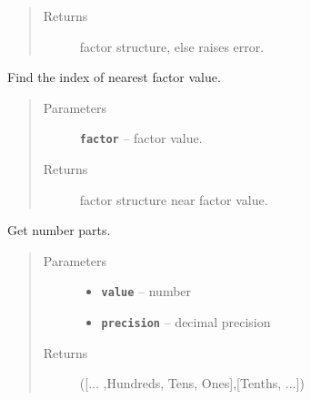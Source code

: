 \documentclass[letterpaper,10pt,english]{sphinxmanual}
\begin{document}
\begin{fulllineitems}
\begin{fulllineitems}
\begin{quote}
\begin{description}
\item[{Returns}] \leavevmode
factor structure, else raises error.

\end{description}\end{quote}

\end{fulllineitems}


\begin{fulllineitems}
\label{RRtoolbox.lib:RRtoolbox.lib.root.FactorConvert.nearFactorIndex}
Find the index of nearest factor value.
\begin{quote}\begin{description}
\item[{Parameters}] \leavevmode
\textbf{\texttt{factor}} -- factor value.

\item[{Returns}] \leavevmode
factor structure near factor value.

\end{description}\end{quote}

\end{fulllineitems}


\begin{fulllineitems}
\label{RRtoolbox.lib:RRtoolbox.lib.root.FactorConvert.parts}
Get number parts.
\begin{quote}\begin{description}
\item[{Parameters}] \leavevmode\begin{itemize}
\item {} 
\textbf{\texttt{value}} -- number

\item {} 
\textbf{\texttt{precision}} -- decimal precision

\end{itemize}

\item[{Returns}] \leavevmode
({[}... ,Hundreds, Tens, Ones{]},{[}Tenths, ...{]})

\end{description}\end{quote}


\end{fulllineitems}
\end{fulllineitems}
\end{document}
